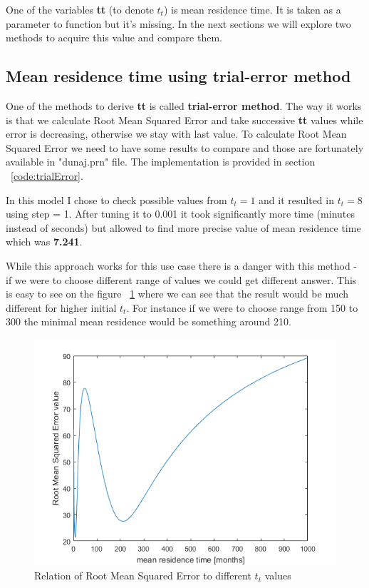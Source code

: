 \documentclass[12pt]{article}
\begin{document}
One of the variables \textbf{tt} (to denote $t_t$) is mean residence time. It is taken as a parameter to function but it's missing. In the next sections we will explore two methods to acquire this value and compare them.

\subsection{Mean residence time using trial-error method}

One of the methods to derive \textbf{tt} is called \textbf{trial-error method}. The way it works is that we calculate Root Mean Squared Error and take successive \textbf{tt} values while error is decreasing, otherwise we stay with last value. To calculate Root Mean Squared Error we need to have some results to compare and those are fortunately available in "dunaj.prn" file. The implementation is provided in section ~\ref{code:trialError}. 

In this model I chose to check possible values from $t_t = 1$ and it resulted in \textbf{$t_t = 8$} using step = 1. After tuning it to 0.001 it took significantly more time (minutes instead of seconds) but allowed to find more precise value of mean residence time which was \textbf{7.241}. 

While this approach works for this use case there is a danger with this method - if we were to choose different range of values we could get different answer. This is easy to see on the figure ~\ref{meanSquare} where we can see that the result would be much different for higher initial $t_t$. For instance if we were to choose range from 150 to 300 the minimal mean residence would be something around 210.

\begin{figure}[H]
	\centering
	\includegraphics[width=\textwidth]{meanSquare}
	\caption{Relation of Root Mean Squared Error to different $t_t$ values}
	\label{meanSquare}
\end{figure}
\end{document}
